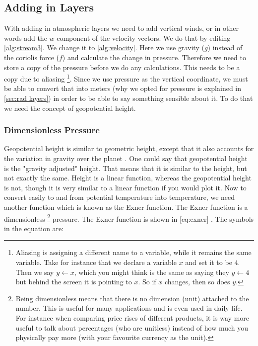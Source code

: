 \subsection{Adding in Layers}
With adding in atmospheric layers we need to add vertical winds, or in other words add the $w$ component of the velocity vectors. We do that by editing \autoref{alg:stream3}. We change it to 
\autoref{alg:velocity}. Here we use gravity ($g$) instead of the coriolis force ($f$) and calculate the change in pressure. Therefore we need to store a copy of the pressure before we do any 
calculations. This needs to be a copy due to aliasing \footnote{Aliasing is assigning a different name to a variable, while it remains the same variable. Take for instance that we declare a 
variable $x$ and set it to be $4$. Then we say $y \leftarrow x$, which you might think is the same as saying they $y \leftarrow 4$ but behind the screen it is pointing to $x$. So if $x$ changes, 
then so does $y$.}. Since we use pressure as the vertical coordinate, we must be able to convert that into meters (why we opted for pressure is explained in \autoref{sec:rad layers}) in order to 
be able to say something sensible about it. To do that we need the concept of geopotential height.

\subsubsection{Dimensionless Pressure}
Geopotential height is similar to geometric height, except that it also accounts for the variation in gravity over the planet \cite{geopot}. One could say that geopotential height is the 
"gravity adjusted" height. That means that it is similar to the height, but not exactly the same. Height is a linear function, whereas the geopotential height is not, though it is very similar 
to a linear function if you would plot it. Now to convert easily to and from potential temperature into temperature, we need another function which is known as the Exner function. The Exner 
function is a dimensionless \footnote{Being dimensionless means that there is no dimension (unit) attached to the number. This is useful for many applications and is even used in daily life. For 
instance when comparing price rises of different products, it is way more useful to talk about percentages (who are unitless) instead of how much you physically pay more (with your favourite 
currency as the unit).} pressure. The Exner function is shown in \autoref{eq:exner} \cite{verticalcoords}. The symbols in the equation are: 

